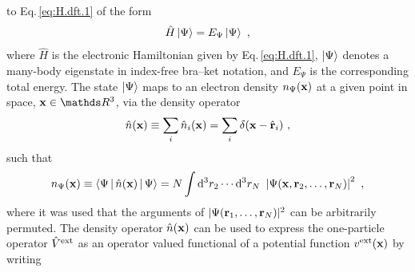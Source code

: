  to Eq.\,\eqref{eq:H.dft.1} of the form
\begin{align}
	\hat H \Ket{\Psi} = E_\Psi \Ket{\Psi}~,
	\label{eq:SE.dft.1}
\end{align}
where $\hat H$ is the electronic Hamiltonian given by Eq.\,\eqref{eq:H.dft.1}, $\Ket{\Psi}$ denotes a many-body eigenstate in index-free bra--ket notation,
and $E_\Psi$ is the corresponding total energy.
The state $\Ket{\Psi}$ maps to an electron density $n_\Psi ({\bf x})$ at a given point in space, ${\bf x} \in \mathds R^3$, via the density operator
\begin{align}
	\hat n ({\bf x}) \equiv \sum_i \hat n_i ({\bf x}) = \sum_i \delta ({\bf x} - \hat{\bf r}_i)~,
	\label{eq:densop}
\end{align}
such that
\begin{align}
	n_\Psi({\bf x}) 
	\equiv \Braket{\Psi | \hat n({\bf x}) | \Psi} 
	= N \int {\rm d}^3 r_2 \cdots {\rm d}^3 r_{N} ~ 
	\left\lvert 
	\Psi ({\bf x}, {\bf r}_2, \ldots, {\bf r}_N) 
	\right\rvert^2~,
\end{align}
where it was used that the arguments of $\lvert \Psi ({\bf r}_1, \ldots, {\bf r}_N) \rvert^2$ can be arbitrarily permuted. %
The density operator $\hat n ({\bf x})$ can be used to express the one-particle operator $\hat{V}^{\rm ext}$ as an operator valued functional of a potential function $v^{\rm ext} ({\bf x})$ by writing
